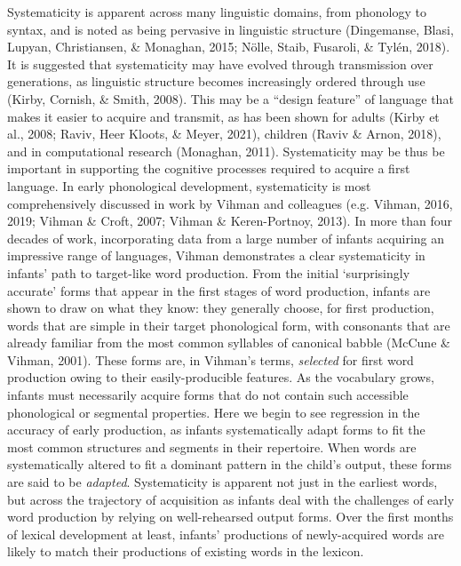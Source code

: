 \documentclass[
  man]{apa6}
\begin{document}
Systematicity is apparent across many linguistic domains, from phonology to syntax, and is noted as being pervasive in linguistic structure (Dingemanse, Blasi, Lupyan, Christiansen, \& Monaghan, 2015; Nölle, Staib, Fusaroli, \& Tylén, 2018). It is suggested that systematicity may have evolved through transmission over generations, as linguistic structure becomes increasingly ordered through use (Kirby, Cornish, \& Smith, 2008). This may be a ``design feature'' of language that makes it easier to acquire and transmit, as has been shown for adults (Kirby et al., 2008; Raviv, Heer Kloots, \& Meyer, 2021), children (Raviv \& Arnon, 2018), and in computational research (Monaghan, 2011). Systematicity may be thus be important in supporting the cognitive processes required to acquire a first language. In early phonological development, systematicity is most comprehensively discussed in work by Vihman and colleagues (e.g. Vihman, 2016, 2019; Vihman \& Croft, 2007; Vihman \& Keren-Portnoy, 2013). In more than four decades of work, incorporating data from a large number of infants acquiring an impressive range of languages, Vihman demonstrates a clear systematicity in infants' path to target-like word production. From the initial `surprisingly accurate' forms that appear in the first stages of word production, infants are shown to draw on what they know: they generally choose, for first production, words that are simple in their target phonological form, with consonants that are already familiar from the most common syllables of canonical babble (McCune \& Vihman, 2001). These forms are, in Vihman's terms, \emph{selected} for first word production owing to their easily-producible features. As the vocabulary grows, infants must necessarily acquire forms that do not contain such accessible phonological or segmental properties. Here we begin to see regression in the accuracy of early production, as infants systematically adapt forms to fit the most common structures and segments in their repertoire. When words are systematically altered to fit a dominant pattern in the child's output, these forms are said to be \emph{adapted}. Systematicity is apparent not just in the earliest words, but across the trajectory of acquisition as infants deal with the challenges of early word production by relying on well-rehearsed output forms. Over the first months of lexical development at least, infants' productions of newly-acquired words are likely to match their productions of existing words in the lexicon.
\end{document}
